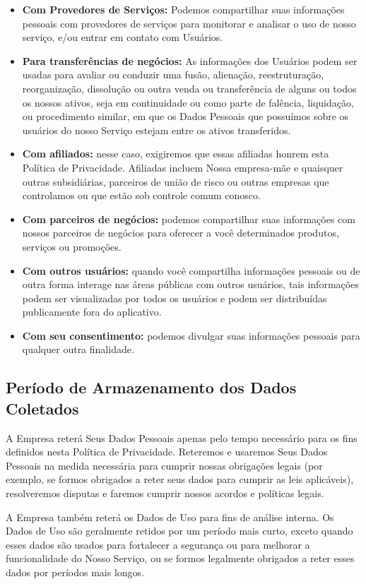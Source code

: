 \begin{itemize}
	\item \textbf{Com Provedores de Serviços:} Podemos compartilhar suas informações pessoais com provedores de serviços para monitorar e analisar o uso de nosso serviço, e/ou entrar em contato com Usuários.
	\item \textbf{Para transferências de negócios:} As informações dos Usuários podem ser usadas para avaliar ou conduzir uma fusão, alienação, reestruturação, reorganização, dissolução ou outra venda ou transferência de alguns ou todos os nossos ativos, seja em continuidade ou como parte de falência, liquidação, ou procedimento similar, em que os Dados Pessoais que possuímos sobre os usuários do nosso Serviço estejam entre os ativos transferidos.
	\item \textbf{Com afiliados:} nesse caso, exigiremos que essas afiliadas honrem esta Política de Privacidade. Afiliadas incluem Nossa empresa-mãe e quaisquer outras subsidiárias, parceiros de união de risco ou outras empresas que controlamos ou que estão sob controle comum conosco.
	\item \textbf{Com parceiros de negócios:} podemos compartilhar suas informações com nossos parceiros de negócios para oferecer a você determinados produtos, serviços ou promoções.
	\item \textbf{Com outros usuários:} quando você compartilha informações pessoais ou de outra forma interage nas áreas públicas com outros usuários, tais informações podem ser visualizadas por todos os usuários e podem ser distribuídas publicamente fora do aplicativo.
	\item \textbf{Com seu consentimento:} podemos divulgar suas informações pessoais para qualquer outra finalidade.
\end{itemize}

\subsection{Período de Armazenamento dos Dados Coletados}

A Empresa reterá Seus Dados Pessoais apenas pelo tempo necessário para os fins definidos nesta Política de Privacidade. Reteremos e usaremos Seus Dados Pessoais na medida necessária para cumprir nossas obrigações legais (por exemplo, se formos obrigados a reter seus dados para cumprir as leis aplicáveis), resolveremos disputas e faremos cumprir nossos acordos e políticas legais.

A Empresa também reterá os Dados de Uso para fins de análise interna. Os Dados de Uso são geralmente retidos por um período mais curto, exceto quando esses dados são usados para fortalecer a segurança ou para melhorar a funcionalidade do Nosso Serviço, ou se formos legalmente obrigados a reter esses dados por períodos mais longos.

